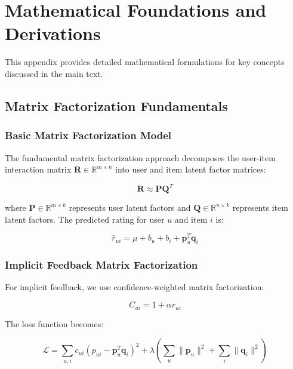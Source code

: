 
\appendix

\section{Mathematical Foundations and Derivations}
\label{appendix:math}

This appendix provides detailed mathematical formulations for key concepts discussed in the main text.

\subsection{Matrix Factorization Fundamentals}

\subsubsection{Basic Matrix Factorization Model}

The fundamental matrix factorization approach decomposes the user-item interaction matrix $\mathbf{R} \in \mathbb{R}^{m \times n}$ into user and item latent factor matrices:

\begin{equation}
\mathbf{R} \approx \mathbf{P} \mathbf{Q}^T
\end{equation}

where $\mathbf{P} \in \mathbb{R}^{m \times k}$ represents user latent factors and $\mathbf{Q} \in \mathbb{R}^{n \times k}$ represents item latent factors. The predicted rating for user $u$ and item $i$ is:

\begin{equation}
\hat{r}_{ui} = \mu + b_u + b_i + \mathbf{p}_u^T \mathbf{q}_i
\end{equation}

\subsubsection{Implicit Feedback Matrix Factorization}

For implicit feedback, we use confidence-weighted matrix factorization:

\begin{equation}
C_{ui} = 1 + \alpha r_{ui}
\end{equation}

The loss function becomes:

\begin{equation}
\mathcal{L} = \sum_{u,i} c_{ui} (p_{ui} - \mathbf{p}_u^T \mathbf{q}_i)^2 + \lambda \left( \sum_u \|\mathbf{p}_u\|^2 + \sum_i \|\mathbf{q}_i\|^2 \right)
\end{equation}

